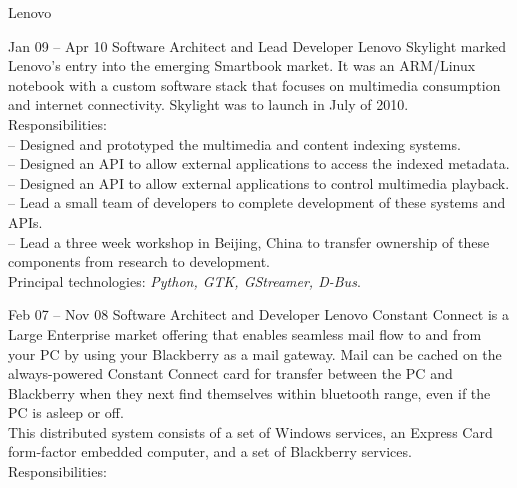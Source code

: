 \documentclass[a4paper, 10pt]{article}
\begin{document}
\begin{resume}
\begin{block}
\begin{category}{Lenovo}
                \bigskip
            \end{category}
            \begin{subcategory}{Jan 09 -- Apr 10}
                 {Software Architect and Lead Developer}
                Lenovo Skylight marked Lenovo's entry into the emerging Smartbook market.
                It was an ARM/Linux notebook with a custom software stack that focuses
                on multimedia consumption and internet connectivity.
                Skylight was to launch in July of 2010.
                \\[1ex]
                Responsibilities: \\
                -- Designed and prototyped the multimedia and content indexing systems. \\
                -- Designed an API to allow external applications to access the indexed metadata. \\
                -- Designed an API to allow external applications to control multimedia playback. \\
                -- Lead a small team of developers to complete development of these systems and APIs. \\
                -- Lead a three week workshop in Beijing, China to transfer ownership of these components from research to development.
                \\[1ex]
                Principal technologies: \emph{Python, GTK, GStreamer, D-Bus}.
                \bigskip
            \end{subcategory}
            \begin{subcategory}{Feb 07 -- Nov 08}
                 {Software Architect and Developer}
                Lenovo Constant Connect is a Large Enterprise market offering that enables
                seamless mail flow to and from your PC by using your Blackberry as a mail
                gateway.  Mail can be cached on the always-powered Constant Connect card for
                transfer between the PC and Blackberry when they next find themselves within
                bluetooth range, even if the PC is asleep or off.
                \\[1ex]
                This distributed system consists of a set of Windows services, an Express Card
                form-factor embedded computer, and a set of Blackberry services.
                \\[1ex]
                Responsibilities: \\

\end{subcategory}
\end{block}
\end{resume}
\end{document}
